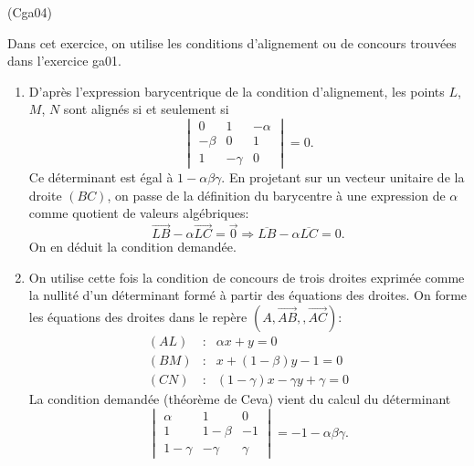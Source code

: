 \begin{tiny}(Cga04)\end{tiny}
Dans cet exercice, on utilise les conditions d'alignement ou de concours trouvées dans l'exercice ga01. 
\begin{enumerate}
  \item D'après l'expression barycentrique de la condition d'alignement, les points $L$, $M$, $N$ sont alignés si et seulement si
\begin{displaymath}
  \begin{vmatrix}
    0      & 1       & -\alpha \\
    -\beta & 0       & 1       \\
    1      & -\gamma & 0
  \end{vmatrix}
=0.
\end{displaymath}
Ce déterminant est égal à $1 - \alpha \beta \gamma$.\newline
En projetant sur un vecteur unitaire de la droite $(BC)$, on passe de la définition du barycentre à une expression de $\alpha$ comme quotient de valeurs algébriques:
\begin{displaymath}
  \overrightarrow{LB} - \alpha \overrightarrow{LC}= \overrightarrow{0}
  \Rightarrow
  \overline{LB} - \alpha \overline{LC}= 0.
\end{displaymath}
On en déduit la condition demandée.
  \item On utilise cette fois la condition de concours de trois droites exprimée comme la nullité d'un déterminant formé à partir des équations des droites. On forme les équations des droites dans le repère $(A,\overrightarrow{AB},,\overrightarrow{AC})$:
\begin{align*}
  (AL) &:& \alpha x + y = 0 \\
  (BM) &:& x + (1-\beta)y - 1 = 0 \\
  (CN) &:& (1-\gamma)x - \gamma y + \gamma = 0
\end{align*}
La condition demandée (théorème de Ceva) vient du calcul du déterminant
\begin{displaymath}
  \begin{vmatrix}
    \alpha   & 1       & 0 \\
    1        & 1-\beta & -1 \\
    1-\gamma & -\gamma & \gamma 
  \end{vmatrix}
= - 1 - \alpha \beta \gamma.
\end{displaymath}


\end{enumerate}
